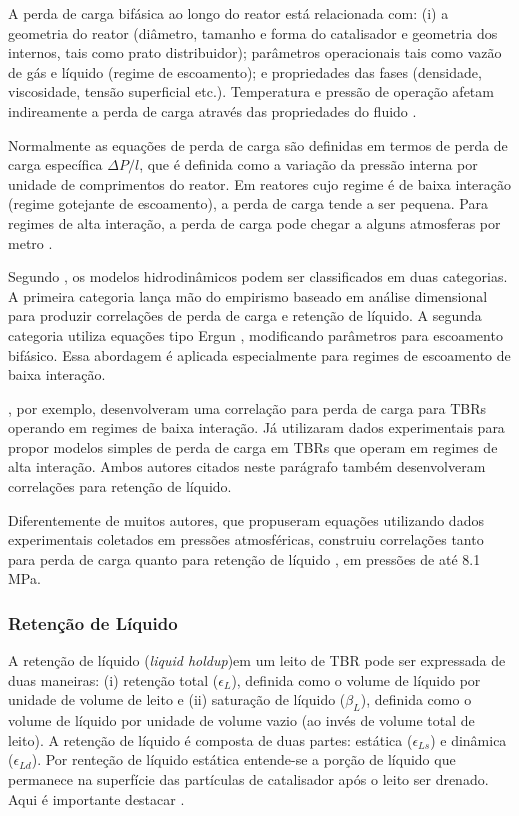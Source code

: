 A perda de carga bifásica ao longo do reator está relacionada com: (i) a
geometria do reator (diâmetro, tamanho e forma do catalisador e geometria dos
internos, tais como prato distribuidor); parâmetros operacionais tais como vazão
de gás e líquido (regime de escoamento); e propriedades das fases (densidade,
viscosidade, tensão superficial etc.). Temperatura e pressão de operação afetam
indireamente a perda de carga através das propriedades do fluido
\cite{Ranade2011}.

Normalmente as equações de perda de carga são definidas em termos de perda de
carga específica $\Delta P/l$, que é definida como a variação da pressão interna
por unidade de comprimentos do reator. Em reatores cujo regime é de baixa
interação (regime gotejante de escoamento), a perda de carga tende a ser
pequena. Para regimes de alta interação, a perda de carga pode chegar a alguns
atmosferas por metro \cite{Benkrid1997}.


Segundo , os modelos hidrodinâmicos podem ser
classificados em duas categorias. A primeira categoria lança mão do empirismo
baseado em análise dimensional para produzir correlações de perda de carga e
retenção de líquido. A segunda categoria utiliza equações tipo Ergun
, modificando parâmetros para escoamento bifásico.
Essa abordagem é aplicada especialmente para regimes de escoamento de baixa
interação.

, por exemplo, desenvolveram uma correlação para perda
de carga para TBRs operando em regimes de baixa interação. Já
 utilizaram dados experimentais para propor modelos
simples de perda de carga em TBRs que operam em regimes de alta
interação. Ambos autores citados neste parágrafo também desenvolveram
correlações para retenção de líquido.

Diferentemente de muitos autores, que propuseram equações utilizando dados
experimentais coletados em pressões atmosféricas, 
construiu correlações tanto para perda de carga quanto para retenção de líquido
, em pressões de até 8.1 MPa.

\subsubsection{Retenção de Líquido}
\label{sec:retencaodeliquido}

A retenção de líquido (\emph{liquid holdup})em um leito de TBR  pode ser
expressada de duas maneiras: (i) retenção total ($\epsilon_L$), definida
como o volume de líquido por unidade de volume de leito e (ii) saturação de líquido
($\beta_L$), definida como o volume de líquido por unidade de volume vazio
(ao invés de volume total de leito). A retenção de líquido é composta de duas
partes: estática ($\epsilon_{Ls}$) e dinâmica ($\epsilon_{Ld}$). Por
renteção de líquido estática entende-se a porção de líquido que permanece na superfície das
partículas de catalisador após o leito ser drenado. Aqui é importante destacar 
\cite{Ranade2011}.

